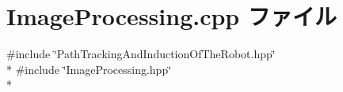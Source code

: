 \section{Image\-Processing.\-cpp ファイル}
\label{_image_processing_8cpp}
{\ttfamily \#include \char`\"{}Path\-Tracking\-And\-Induction\-Of\-The\-Robot.\-hpp\char`\"{}}\\*
{\ttfamily \#include \char`\"{}Image\-Processing.\-hpp\char`\"{}}\\*
